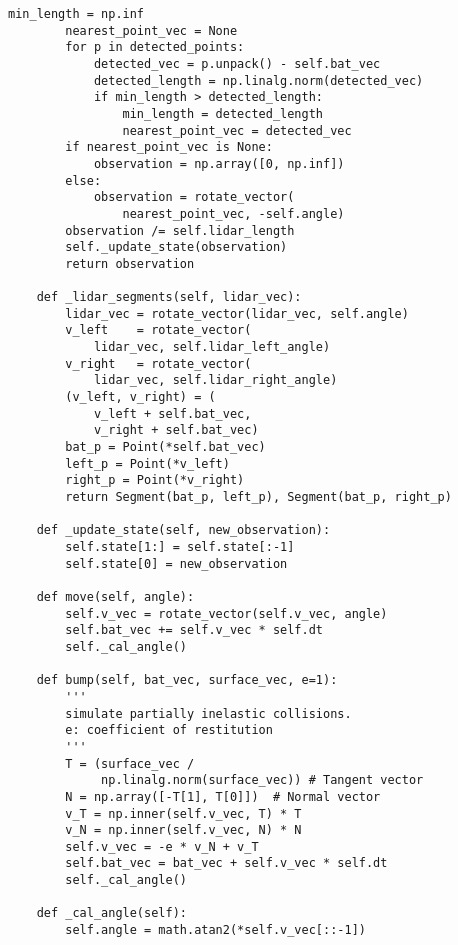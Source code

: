 \documentclass[../appendix]{subfiles}
\begin{document}
\begin{lstlisting}[frame=single]
        min_length = np.inf
        nearest_point_vec = None
        for p in detected_points:
            detected_vec = p.unpack() - self.bat_vec
            detected_length = np.linalg.norm(detected_vec)
            if min_length > detected_length:
                min_length = detected_length
                nearest_point_vec = detected_vec
        if nearest_point_vec is None:
            observation = np.array([0, np.inf])
        else:
            observation = rotate_vector(
                nearest_point_vec, -self.angle) 
        observation /= self.lidar_length
        self._update_state(observation)
        return observation

    def _lidar_segments(self, lidar_vec):
        lidar_vec = rotate_vector(lidar_vec, self.angle)
        v_left    = rotate_vector(
            lidar_vec, self.lidar_left_angle)
        v_right   = rotate_vector(
            lidar_vec, self.lidar_right_angle)
        (v_left, v_right) = (
            v_left + self.bat_vec, 
            v_right + self.bat_vec)
        bat_p = Point(*self.bat_vec)
        left_p = Point(*v_left)
        right_p = Point(*v_right)
        return Segment(bat_p, left_p), Segment(bat_p, right_p)

    def _update_state(self, new_observation):
        self.state[1:] = self.state[:-1]
        self.state[0] = new_observation

    def move(self, angle):
        self.v_vec = rotate_vector(self.v_vec, angle)
        self.bat_vec += self.v_vec * self.dt
        self._cal_angle()
    
    def bump(self, bat_vec, surface_vec, e=1):
        '''
        simulate partially inelastic collisions.
        e: coefficient of restitution
        '''
        T = (surface_vec / 
             np.linalg.norm(surface_vec)) # Tangent vector
        N = np.array([-T[1], T[0]])  # Normal vector
        v_T = np.inner(self.v_vec, T) * T
        v_N = np.inner(self.v_vec, N) * N
        self.v_vec = -e * v_N + v_T
        self.bat_vec = bat_vec + self.v_vec * self.dt
        self._cal_angle()

    def _cal_angle(self):
        self.angle = math.atan2(*self.v_vec[::-1])
\end{lstlisting}
\end{document}
